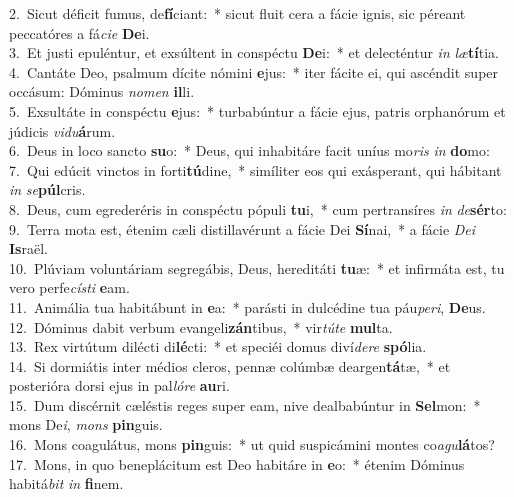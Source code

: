 {2.~}Sicut déficit fumus, de\textbf{fí}ciant:~* sicut fluit cera a fácie ignis, sic péreant peccatóres a fá\textit{ci}\textit{e} \textbf{De}i.\\
{3.~}Et justi epuléntur, et exsúltent in conspéctu \textbf{De}i:~* et delecténtur \textit{in} \textit{læ}\textbf{tí}tia.\\
{4.~}Cantáte Deo, psalmum dícite nómini \textbf{e}jus:~* iter fácite ei, qui ascéndit super occásum: Dóminus \textit{no}\textit{men} \textbf{il}li.\\
{5.~}Exsultáte in conspéctu \textbf{e}jus:~* turbabúntur a fácie ejus, patris orphanórum et júdicis \textit{vi}\textit{du}\textbf{á}rum.\\
{6.~}Deus in loco sancto \textbf{su}o:~* Deus, qui inhabitáre facit uníus mo\textit{ris} \textit{in} \textbf{do}mo:\\
{7.~}Qui edúcit vinctos in forti\textbf{tú}dine,~* simíliter eos qui exásperant, qui hábitant \textit{in} \textit{se}\textbf{púl}cris.\\
{8.~}Deus, cum egrederéris in conspéctu pópuli \textbf{tu}i,~* cum pertransíres \textit{in} \textit{de}\textbf{sér}to:\\
{9.~}Terra mota est, étenim cæli distillavérunt a fácie Dei \textbf{Sí}nai,~* a fácie \textit{De}\textit{i} \textbf{Is}raël.\\
{10.~}Plúviam voluntáriam segregábis, Deus, hereditáti \textbf{tu}æ:~* et infirmáta est, tu vero perfe\textit{cí}\textit{sti} \textbf{e}am.\\
{11.~}Animália tua habitábunt in \textbf{e}a:~* parásti in dulcédine tua páu\textit{pe}\textit{ri}, \textbf{De}us.\\
{12.~}Dóminus dabit verbum evangeli\textbf{zán}tibus,~* vir\textit{tú}\textit{te} \textbf{mul}ta.\\
{13.~}Rex virtútum dilécti di\textbf{lé}cti:~* et speciéi domus diví\textit{de}\textit{re} \textbf{spó}lia.\\
{14.~}Si dormiátis inter médios cleros, pennæ colúmbæ deargen\textbf{tá}tæ,~* et posterióra dorsi ejus in pal\textit{ló}\textit{re} \textbf{au}ri.\\
{15.~}Dum discérnit cæléstis reges super eam, nive dealbabúntur in \textbf{Sel}mon:~* mons De\textit{i}, \textit{mons} \textbf{pin}guis.\\
{16.~}Mons coagulátus, mons \textbf{pin}guis:~* ut quid suspicámini montes co\textit{a}\textit{gu}\textbf{lá}tos?\\
{17.~}Mons, in quo beneplácitum est Deo habitáre in \textbf{e}o:~* étenim Dóminus habitá\textit{bit} \textit{in} \textbf{fi}nem.\\
